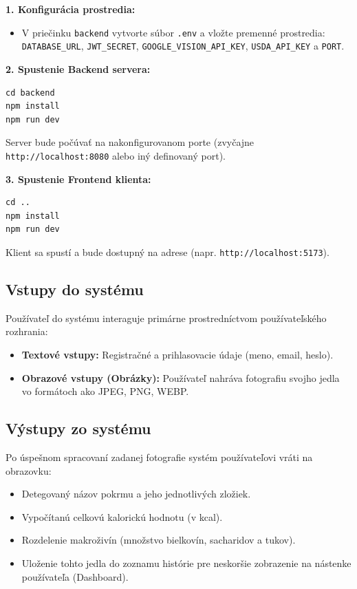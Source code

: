 \documentclass[12pt, a4paper]{article}
\begin{document}
\textbf{1. Konfigurácia prostredia:}
\begin{itemize}
    \item V priečinku \texttt{backend} vytvorte súbor \texttt{.env} a vložte premenné prostredia: \texttt{DATABASE\_URL}, \texttt{JWT\_SECRET}, \texttt{GOOGLE\_VISION\_API\_KEY}, \texttt{USDA\_API\_KEY} a \texttt{PORT}.
\end{itemize}

\textbf{2. Spustenie Backend servera:}
\begin{verbatim}
cd backend
npm install
npm run dev
\end{verbatim}
Server bude počúvať na nakonfigurovanom porte (zvyčajne \texttt{http://localhost:8080} alebo iný definovaný port).

\textbf{3. Spustenie Frontend klienta:}
\begin{verbatim}
cd ..
npm install
npm run dev
\end{verbatim}
Klient sa spustí a bude dostupný na adrese (napr. \texttt{http://localhost:5173}).

\subsection{Vstupy do systému}
Používateľ do systému interaguje primárne prostredníctvom používateľského rozhrania:
\begin{itemize}
    \item \textbf{Textové vstupy:} Registračné a prihlasovacie údaje (meno, email, heslo).
    \item \textbf{Obrazové vstupy (Obrázky):} Používateľ nahráva fotografiu svojho jedla vo formátoch ako JPEG, PNG, WEBP.
\end{itemize}

\subsection{Výstupy zo systému}
Po úspešnom spracovaní zadanej fotografie systém používateľovi vráti na obrazovku:
\begin{itemize}
    \item Detegovaný názov pokrmu a jeho jednotlivých zložiek.
    \item Vypočítanú celkovú kalorickú hodnotu (v kcal).
    \item Rozdelenie makroživín (množstvo bielkovín, sacharidov a tukov).
    \item Uloženie tohto jedla do zoznamu histórie pre neskoršie zobrazenie na nástenke používateľa (Dashboard).
\end{itemize}
\end{document}
